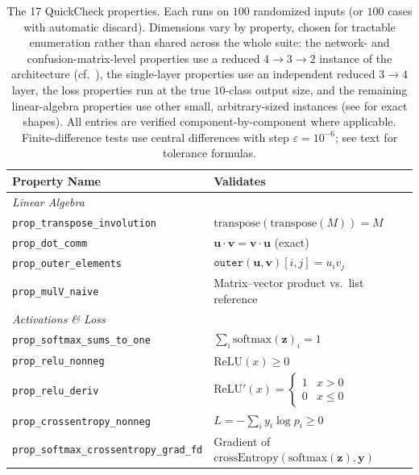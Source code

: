 \documentclass[sigconf,nonacm]{acmart}
\begin{document}
\begin{table}[t]
  \centering
  \caption{The 17 QuickCheck properties. Each runs on $100$ randomized inputs
    (or $100$ cases with automatic discard). Dimensions vary by property, chosen
    for tractable enumeration rather than shared across the whole suite: the
    network- and confusion-matrix-level properties use a reduced $4 \to 3 \to 2$
    instance of the architecture (cf.\ ), the single-layer
    properties use an independent reduced $3 \to 4$ layer, the loss properties
    run at the true $10$-class output size, and the remaining linear-algebra
    properties use other small, arbitrary-sized instances (see
     for exact shapes). All entries are verified
    component-by-component where applicable.
    Finite-difference tests use central differences with step
    $\varepsilon = 10^{-6}$; see text for tolerance formulas.}
  \label{tab:properties}
  \begin{tabular}{l l}
    \toprule
    \textbf{Property Name} & \textbf{Validates} \\
    \midrule
    \multicolumn{2}{l}{\emph{Linear Algebra}} \\
    \texttt{prop\_transpose\_involution} & $\mathrm{transpose}(\mathrm{transpose}(M)) = M$ \\
    \texttt{prop\_dot\_comm} & $\mathbf{u} \cdot \mathbf{v} = \mathbf{v} \cdot \mathbf{u}$ (exact) \\
    \texttt{prop\_outer\_elements} & $\mathtt{outer}(\mathbf{u}, \mathbf{v})[i,j] = u_i v_j$ \\
    \texttt{prop\_mulV\_naive} & Matrix--vector product vs.\ list reference \\
    \midrule
    \multicolumn{2}{l}{\emph{Activations \& Loss}} \\
    \texttt{prop\_softmax\_sums\_to\_one} & $\sum_i \mathrm{softmax}(\mathbf{z})_i = 1$ \\
    \texttt{prop\_relu\_nonneg} & $\mathrm{ReLU}(x) \ge 0$ \\
    \texttt{prop\_relu\_deriv} & $\mathrm{ReLU}'(x) = \begin{cases} 1 & x > 0 \\ 0 & x \le 0 \end{cases}$ \\
    \texttt{prop\_crossentropy\_nonneg} & $L = -\sum_i y_i \log p_i \ge 0$ \\
    \texttt{prop\_softmax\_crossentropy\_grad\_fd} & Gradient of $\mathrm{crossEntropy}(\mathrm{softmax}(\mathbf{z}), \mathbf{y})$ \\

\end{tabular}
\end{table}
\end{document}
